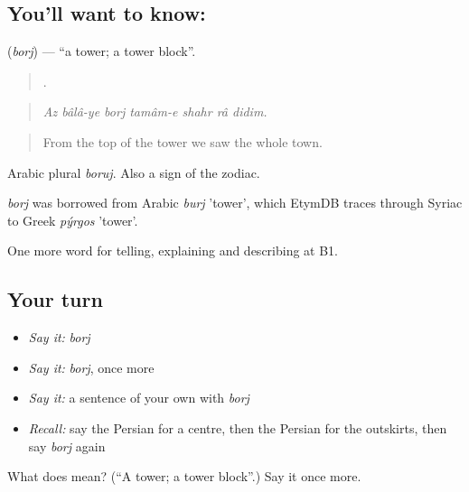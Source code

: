\subsection*{You'll want to know: }
\textbf{} (\emph{borj}) — \textquotedblleft{}a tower; a tower block\textquotedblright{}.

\begin{quote}
      .
\end{quote}

\begin{quote}
\emph{Az bâlâ-ye borj tamâm-e shahr râ didim.}
\end{quote}

\begin{quote}
From the top of the tower we saw the whole town.
\end{quote}

Arabic plural \emph{boruj}. Also a sign of the zodiac.

\begin{cousinweb}
\emph{borj} was borrowed from Arabic \emph{burj} 'tower', which EtymDB traces through Syriac to Greek \emph{pýrgos} 'tower'.
\end{cousinweb}

\begin{grammarlens}[title={What you've built}]
One more word for telling, explaining and describing at B1.
\end{grammarlens}

\subsection*{Your turn}
\begin{itemize}
\raggedright
  \item \emph{Say it:} \emph{borj}
  \item \emph{Say it:} \emph{borj}, once more
  \item \emph{Say it:} a sentence of your own with \emph{borj}
  \item \emph{Recall:} say the Persian for a centre, then the Persian for the outskirts, then say \emph{borj} again
\end{itemize}

\begin{tcolorbox}[breakable,colback=teal!4,colframe=teal!35!black,title={Before you move on}]
What does  mean? (\textquotedblleft{}A tower; a tower block\textquotedblright{}.) Say it once more.
\end{tcolorbox}
